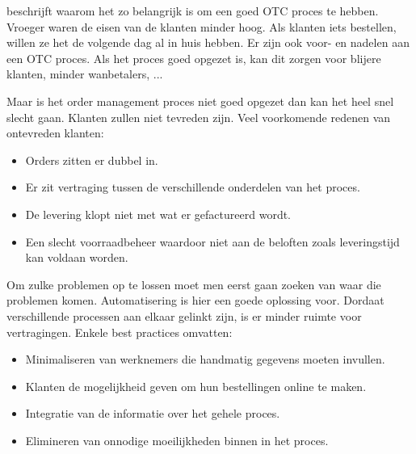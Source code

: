 \textcite{PEARSON2017} beschrijft waarom het zo belangrijk is om een goed OTC proces te hebben. Vroeger waren de eisen van de klanten minder hoog. Als klanten iets bestellen, willen ze het de volgende dag al in huis hebben. Er zijn ook voor- en nadelen aan een OTC proces. Als het proces goed opgezet is, kan dit zorgen voor blijere klanten, minder wanbetalers, ... 

Maar is het order management proces niet goed opgezet dan kan het heel snel slecht gaan. Klanten zullen niet tevreden zijn. 
Veel voorkomende redenen van ontevreden klanten:
\begin{itemize}
	\item Orders zitten er dubbel in.
	\item Er zit vertraging tussen de verschillende onderdelen van het proces.
	\item De levering klopt niet met wat er gefactureerd wordt.
	\item Een slecht voorraadbeheer waardoor niet aan de beloften zoals leveringstijd kan voldaan worden.
\end{itemize}
Om zulke problemen op te lossen moet men eerst gaan zoeken van waar die problemen komen. Automatisering is hier een goede oplossing voor. Dordaat verschillende processen aan elkaar gelinkt zijn, is er minder ruimte voor vertragingen. Enkele best practices omvatten:
\begin{itemize}
	\item Minimaliseren van werknemers die handmatig gegevens moeten invullen.
	\item Klanten de mogelijkheid geven om hun bestellingen online te maken.
	\item Integratie van de informatie over het gehele proces.
	\item Elimineren van onnodige moeilijkheden binnen in het proces.
\end{itemize}

